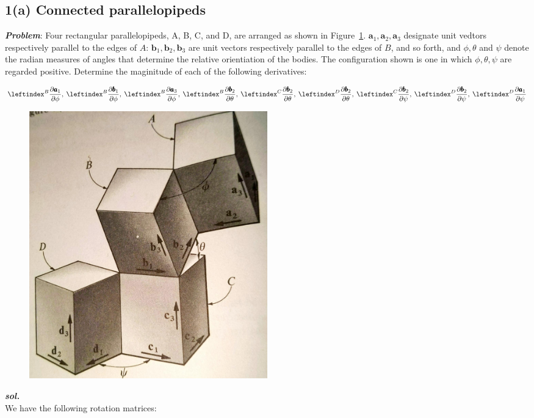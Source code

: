 \subsection{1(a) Connected parallelopipeds}
\textbf{\textit{Problem}}: Four rectangular parallelopipeds, A, B, C, and D, are arranged as shown in Figure~\ref{1_a}.
$\pmb a_1, \pmb a_2, \pmb a_3$ designate unit vedtors respectively parallel to the edges of $A$: $\pmb b_1, \pmb b_2, \pmb b_3$ are unit vectors respectively parallel to the edges of $B$, and so forth, and $\phi, \theta$ and $\psi$ denote the radian measures of angles that determine the relative orientiation of the bodies.
The configuration shown is one in which $\phi, \theta, \psi$ are regarded positive. Determine the maginitude of each of the following derivatives:

\begin{align*}
  \lx{^B}{\frac {\partial \pmb a_1}  {\partial \phi}}, \:
  \lx{^B}{\frac {\partial \pmb b_1}  {\partial \phi}}, \:
  \lx{^B}{\frac {\partial \pmb a_3}  {\partial \phi}}, \:
  \lx{^B}{\frac {\partial \pmb b_2}  {\partial \theta}}, \:
  \lx{^C}{\frac {\partial \pmb b_2}  {\partial \theta}}, \:
  \lx{^D}{\frac {\partial \pmb b_2}  {\partial \theta}}, \:
  \lx{^C}{\frac {\partial \pmb b_2}  {\partial \psi}}, \:
  \lx{^D}{\frac {\partial \pmb b_2}  {\partial \psi}}, \:
  \lx{^D}{\frac {\partial \pmb a_1}  {\partial \psi}}
\end{align*}

\begin{figure}[H]
    \centering
    \includegraphics[width = 0.5\textwidth, height = 0.5\textwidth]{./figs/ProbSet_1/1_a.jpg}
    \caption{}
    \label{1_a}
\end{figure}


\textbf{\textit{sol.}}\\

We have the following rotation matrices:

